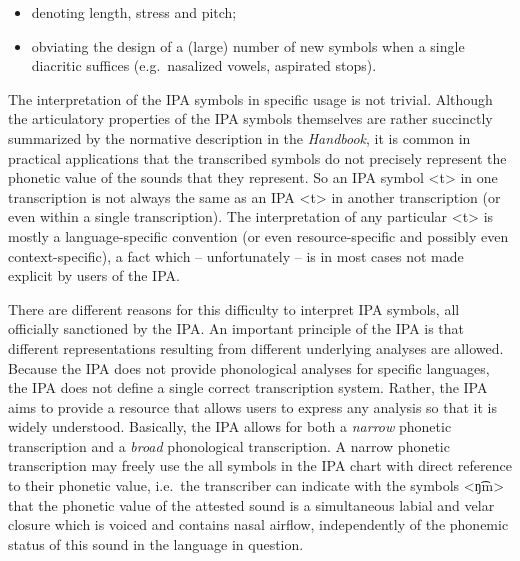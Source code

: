\begin{itemize}

 	\item denoting length, stress and pitch;
	\item obviating the design of a (large) number of new symbols when a 
		  single diacritic suffices (e.g.\ nasalized vowels, aspirated stops). 
               
\end{itemize}	

The interpretation of the IPA symbols in specific usage is not trivial. Although
the articulatory properties of the IPA symbols themselves are rather succinctly
summarized by the normative description in the \textit{Handbook}, it is common
in practical applications that the transcribed symbols do not precisely
represent the phonetic value of the sounds that they represent. So an IPA symbol
<t> in one transcription is not always the same as an IPA <t> in another
transcription (or even within a single transcription). The interpretation of any
particular <t> is mostly a language-specific convention (or even
resource-specific and possibly even context-specific), a fact which --
unfortunately -- is in most cases not made explicit by users of the IPA.

There are different reasons for this difficulty to interpret IPA symbols, all
officially sanctioned by the IPA. An important principle of the IPA is that
different representations resulting from different underlying analyses are
allowed. Because the IPA does not provide phonological analyses for specific
languages, the IPA does not define a single correct transcription system.
Rather, the IPA aims to provide a resource that allows users to express any
analysis so that it is widely understood. Basically, the IPA allows for both a 
\textit{narrow} phonetic transcription and a \textit{broad} phonological transcription. 
A narrow phonetic transcription may freely use the all symbols in the IPA 
chart with direct reference to their phonetic value, i.e.\ the transcriber can 
indicate with the symbols <ŋ͡m> that the phonetic value of the attested sound 
is a simultaneous labial and velar closure which is voiced and contains nasal 
airflow, independently of the phonemic status of this sound in the language in 
question. 


